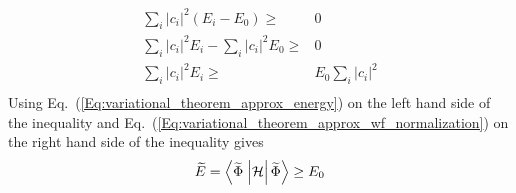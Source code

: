 \begin{hphproof}
\begin{equation*}
\begin{split}
    \sum_i{\left| c_i \right|^2 \left( E_i - E_0 \right)} \ge{}& 0   \\
    \sum_i{\left| c_i \right|^2 E_i} - \sum_i{\left| c_i \right|^2 E_0} \ge{}& 0   \\ 
    \sum_i{\left| c_i \right|^2 E_i} \ge{}& E_0 \sum_i{\left| c_i \right|^2}   \\ 
  \end{split}
\end{equation*}
%
Using Eq.~(\ref{Eq:variational_theorem_approx_energy}) on the left hand side of the inequality and Eq.~(\ref{Eq:variational_theorem_approx_wf_normalization}) on the right hand side of the inequality gives
%
\begin{equation*}
  \displaystyle
  \widetilde{E} = \braketop{\widetilde{\Phi}}{\mathcal{H}}{\widetilde{\Phi}} \ge{} E_0
\end{equation*}

\qedfilled

\end{hphproof}



%

